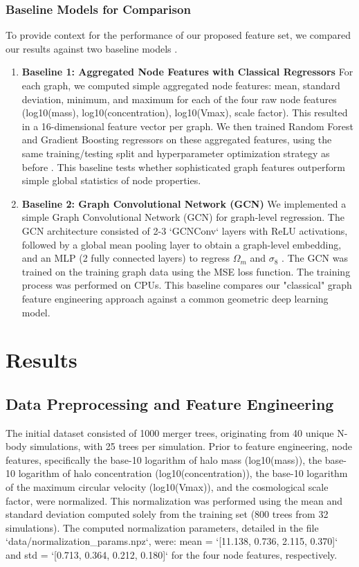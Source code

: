 \documentclass[twocolumn]{aastex631}
\begin{document}
\subsubsection{Baseline Models for Comparison}
To provide context for the performance of our proposed feature set, we compared our results against two baseline models \citep{pan2024astromlab2astrollama270bmodel,dehaan2025astromlab3achievinggpt4o}.
\begin{enumerate}
    \item \textbf{Baseline 1: Aggregated Node Features with Classical Regressors}
For each graph, we computed simple aggregated node features: mean, standard deviation, minimum, and maximum for each of the four raw node features (log10(mass), log10(concentration), log10(Vmax), scale factor). This resulted in a 16-dimensional feature vector per graph. We then trained Random Forest and Gradient Boosting regressors on these aggregated features, using the same training/testing split and hyperparameter optimization strategy as before \citep{soo2023machinelearningapplicationsastrophysics}. This baseline tests whether sophisticated graph features outperform simple global statistics of node properties.
    \item \textbf{Baseline 2: Graph Convolutional Network (GCN)}
We implemented a simple Graph Convolutional Network (GCN) for graph-level regression. The GCN architecture consisted of 2-3 `GCNConv` layers with ReLU activations, followed by a global mean pooling layer to obtain a graph-level embedding, and an MLP (2 fully connected layers) to regress $\Omega_m$ and $\sigma_8$ \citep{zhong2024improvingconvolutionalneuralnetworks,kvasiuk2024reconstructioncontinuouscosmologicalfields}. The GCN was trained on the training graph data using the MSE loss function. The training process was performed on CPUs. This baseline compares our "classical" graph feature engineering approach against a common geometric deep learning model.
\end{enumerate}

\section{Results}
\label{sec:results}
\subsection{Data Preprocessing and Feature Engineering}

The initial dataset consisted of 1000 merger trees, originating from 40 unique N-body simulations, with 25 trees per simulation. Prior to feature engineering, node features, specifically the base-10 logarithm of halo mass (log10(mass)), the base-10 logarithm of halo concentration (log10(concentration)), the base-10 logarithm of the maximum circular velocity (log10(Vmax)), and the cosmological scale factor, were normalized. This normalization was performed using the mean and standard deviation computed solely from the training set (800 trees from 32 simulations). The computed normalization parameters, detailed in the file `data/normalization\_params.npz`, were: mean = `[11.138, 0.736, 2.115, 0.370]` and std = `[0.713, 0.364, 0.212, 0.180]` for the four node features, respectively.
\end{document}
